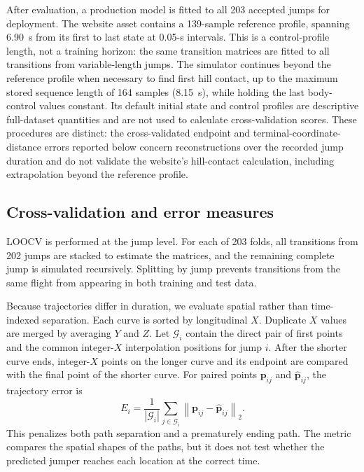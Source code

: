 \documentclass[11pt,twoside,a4paper]{article}
\begin{document}
After evaluation, a production model is fitted to all 203 accepted jumps for deployment. The website asset contains a 139-sample reference profile, spanning 6.90~s from its first to last state at 0.05-s intervals. This is a control-profile length, not a training horizon: the same transition matrices are fitted to all transitions from variable-length jumps. The simulator continues beyond the reference profile when necessary to find first hill contact, up to the maximum stored sequence length of 164 samples (8.15~s), while holding the last body-control values constant. Its default initial state and control profiles are descriptive full-dataset quantities and are not used to calculate cross-validation scores. These procedures are distinct: the cross-validated endpoint and terminal-coordinate-distance errors reported below concern reconstructions over the recorded jump duration and do not validate the website's hill-contact calculation, including extrapolation beyond the reference profile.

\subsection{Cross-validation and error measures}\label{sec:evaluation}

LOOCV is performed at the jump level. For each of 203 folds, all transitions from 202 jumps are stacked to estimate the matrices, and the remaining complete jump is simulated recursively. Splitting by jump prevents transitions from the same flight from appearing in both training and test data.

Because trajectories differ in duration, we evaluate spatial rather than time-indexed separation. Each curve is sorted by longitudinal $X$. Duplicate $X$ values are merged by averaging $Y$ and $Z$. Let $\mathcal{G}_i$ contain the direct pair of first points and the common integer-$X$ interpolation positions for jump $i$. After the shorter curve ends, integer-$X$ points on the longer curve and its endpoint are compared with the final point of the shorter curve. For paired points $\mathbf{p}_{ij}$ and $\widehat{\mathbf{p}}_{ij}$, the trajectory error is
\begin{equation}
E_i=\frac{1}{|\mathcal{G}_i|}\sum_{j\in\mathcal{G}_i}
\left\lVert\mathbf{p}_{ij}-\widehat{\mathbf{p}}_{ij}\right\rVert_2.
\label{eq:error}
\end{equation}
This penalizes both path separation and a prematurely ending path. The metric compares the spatial shapes of the paths, but it does not test whether the predicted jumper reaches each location at the correct time.
\end{document}
